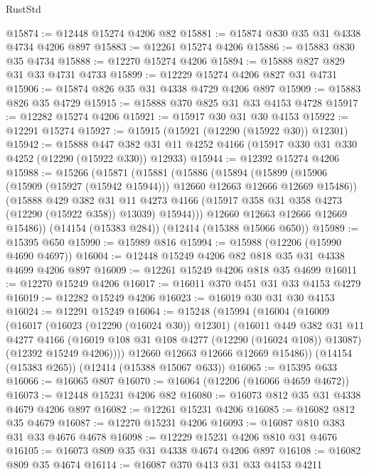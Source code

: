 \begin{lexlean}{RustStd}
\begin{coremodule}
{\begin{coremodule}
{{{{{{{{{{{{{{{{{{{{{{{{{{{{{{{{{{{{{{{{{{{{{{{{{{@15874 := @12448 @15274 @4206 @82
@15881 := @15874 @830 @35 @31 @4338 @4734 @4206 @897
@15883 := @12261 @15274 @4206
@15886 := @15883 @830 @35 @4734
@15888 := @12270 @15274 @4206
@15894 := @15888 @827 @829 @31 @33 @4731 @4733
@15899 := @12229 @15274 @4206 @827 @31 @4731
@15906 := @15874 @826 @35 @31 @4338 @4729 @4206 @897
@15909 := @15883 @826 @35 @4729
@15915 := @15888 @370 @825 @31 @33 @4153 @4728
@15917 := @12282 @15274 @4206
@15921 := @15917 @30 @31 @30 @4153
@15922 := @12291 @15274
@15927 := @15915 (@15921 (@12290 (@15922 @30)) @12301)
@15942 := @15888
    @447
    @382
    @31
    @11
    @4252
    @4166
    (@15917 @330 @31 @330 @4252 (@12290 (@15922 @330)) @12933)
@15944 := @12392 @15274 @4206
@15988 := @15266
    (@15871
      (@15881
        (@15886
          (@15894
            (@15899 (@15906 (@15909 (@15927 (@15942 @15944))) @12660 @12663 @12666 @12669 @15486))
            (@15888
              @429
              @382
              @31
              @11
              @4273
              @4166
              (@15917 @358 @31 @358 @4273 (@12290 (@15922 @358)) @13039)
              @15944)))
        @12660
        @12663
        @12666
        @12669
        @15486))
    (@14154 (@15383 @284))
    (@12414 (@15388 @15066 @650))
@15989 := @15395 @650
@15990 := @15989 @816
@15994 := @15988 (@12206 (@15990 @4690 @4697))
@16004 := @12448 @15249 @4206 @82 @818 @35 @31 @4338 @4699 @4206 @897
@16009 := @12261 @15249 @4206 @818 @35 @4699
@16011 := @12270 @15249 @4206
@16017 := @16011 @370 @451 @31 @33 @4153 @4279
@16019 := @12282 @15249 @4206
@16023 := @16019 @30 @31 @30 @4153
@16024 := @12291 @15249
@16064 := @15248
    (@15994
      (@16004
        (@16009
          (@16017
            (@16023 (@12290 (@16024 @30)) @12301)
            (@16011
              @449
              @382
              @31
              @11
              @4277
              @4166
              (@16019 @108 @31 @108 @4277 (@12290 (@16024 @108)) @13087)
              (@12392 @15249 @4206))))
        @12660
        @12663
        @12666
        @12669
        @15486))
    (@14154 (@15383 @265))
    (@12414 (@15388 @15067 @633))
@16065 := @15395 @633
@16066 := @16065 @807
@16070 := @16064 (@12206 (@16066 @4659 @4672))
@16073 := @12448 @15231 @4206 @82
@16080 := @16073 @812 @35 @31 @4338 @4679 @4206 @897
@16082 := @12261 @15231 @4206
@16085 := @16082 @812 @35 @4679
@16087 := @12270 @15231 @4206
@16093 := @16087 @810 @383 @31 @33 @4676 @4678
@16098 := @12229 @15231 @4206 @810 @31 @4676
@16105 := @16073 @809 @35 @31 @4338 @4674 @4206 @897
@16108 := @16082 @809 @35 @4674
@16114 := @16087 @370 @413 @31 @33 @4153 @4211
}}}}}}}}}}}}}}}}}}}}}}}}}}}}}}}}}}}}}}}}}}}}}}}}}}
\end{coremodule}}
\end{coremodule}
\end{lexlean}

